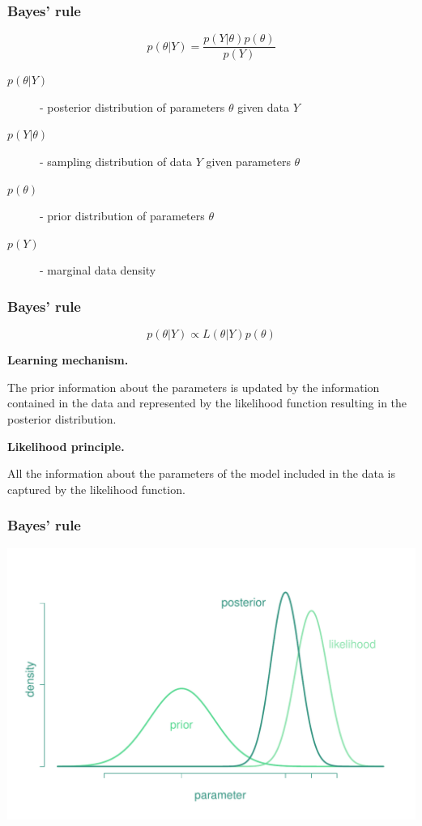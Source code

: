 \documentclass[notes,blackandwhite,mathsans]{beamer}
\begin{document}
\begin{frame}
\frametitle{Bayes' rule}

$$ p\left( \theta|Y \right) = \frac{p\left( Y|\theta \right)p\left( \theta \right)}{p\left( Y \right)}  $$


\bigskip
\begin{description}
\item[$p\left( \theta|Y \right)$] {\color{mcxs2}- posterior distribution of parameters} $\theta$ {\color{mcxs2}given data} $Y$
\item[$p\left( Y|\theta \right)$] {\color{mcxs2}- sampling distribution of data} $Y$ {\color{mcxs2}given parameters} $\theta$
\item[$p\left( \theta \right)$] {\color{mcxs2}- prior distribution of parameters} $\theta$
\item[$p\left( Y \right)$] {\color{mcxs2}- marginal data density}
\end{description}

\end{frame}


\begin{frame}
\frametitle{Bayes' rule}

$$ p\left( \theta|Y \right) \propto L\left( \theta| Y \right)p\left( \theta \right)$$

\bigskip
\textbf{Learning mechanism.}

{\color{mcxs2}The prior information about the parameters is updated by the information contained in the data and represented by the likelihood function resulting in the posterior distribution.}

\bigskip
\textbf{Likelihood principle.}

{\color{mcxs2}All the information about the parameters of the model included in the data is captured by the likelihood function.}

\end{frame}


{
\begin{frame}
\frametitle{Bayes' rule}

\centering
\includegraphics[scale=0.45]{grphs/learning.pdf}

\end{frame}
}
\end{document}
